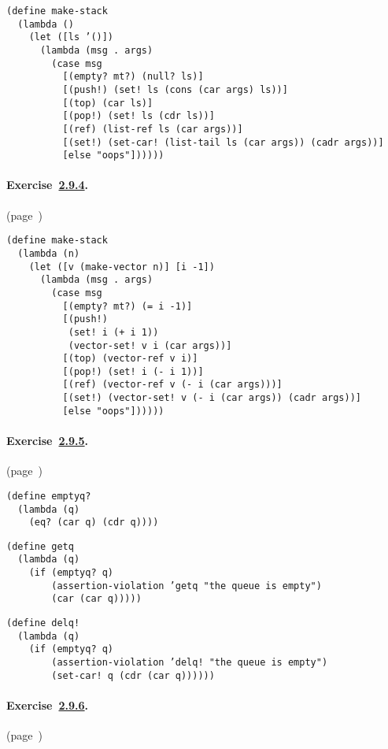   
\begin{alltt}
 (define make-stack
   (lambda ()
     (let ([ls '()])
       (lambda (msg . args)
         (case msg
           [(empty? mt?) (null? ls)]
           [(push!) (set! ls (cons (car args) ls))]
           [(top) (car ls)]
           [(pop!) (set! ls (cdr ls))]
           [(ref) (list-ref ls (car args))]
           [(set!) (set-car! (list-tail ls (car args)) (cadr args))]
           [else "oops"])))))
\end{alltt}



\paragraph{Exercise \hyperref[start_g44]{2.9.4}. }(page \pageref{start_s192})

  
\begin{alltt}
 (define make-stack
   (lambda (n)
     (let ([v (make-vector n)] [i -1])
       (lambda (msg . args)
         (case msg
           [(empty? mt?) (= i -1)]
           [(push!)
            (set! i (+ i 1))
            (vector-set! v i (car args))]
           [(top) (vector-ref v i)]
           [(pop!) (set! i (- i 1))]
           [(ref) (vector-ref v (- i (car args)))]
           [(set!) (vector-set! v (- i (car args)) (cadr args))]
           [else "oops"])))))
\end{alltt}



\paragraph{Exercise \hyperref[start_g45]{2.9.5}. }(page \pageref{start_s194})

  
\begin{alltt}
 (define emptyq?
   (lambda (q)
     (eq? (car q) (cdr q)))) 

(define getq
   (lambda (q)
     (if (emptyq? q)
         (assertion-violation 'getq "the queue is empty")
         (car (car q))))) 

(define delq!
   (lambda (q)
     (if (emptyq? q)
         (assertion-violation 'delq! "the queue is empty")
         (set-car! q (cdr (car q))))))
\end{alltt}



\paragraph{Exercise \hyperref[start_g46]{2.9.6}. }(page \pageref{start_s195})

